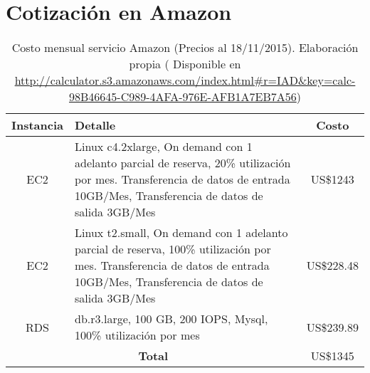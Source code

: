 \section{Cotización en Amazon} \label{sec:cotizacionAmazon}

\begin{table}[H]
	\centering
	\begin{tabular}{| c | p{10cm} | c |}
		\hline
		Instancia    & Detalle & Costo\\ \hline
		EC2 &  Linux c4.2xlarge, On demand con 1 adelanto parcial de reserva, 20\% utilización por mes. Transferencia de datos de entrada 10GB/Mes, Transferencia de datos de salida 3GB/Mes & US\$1243
		
		 \\ \hline
		EC2 &  Linux t2.small, On demand con 1 adelanto parcial de reserva, 100\% utilización por mes. Transferencia de datos de entrada 10GB/Mes, Transferencia de datos de salida 3GB/Mes & US\$228.48
		 \\ \hline
		RDS &  db.r3.large, 100 GB, 200 IOPS, Mysql, 100\% utilización por mes  & US\$239.89
		\\ \hline
		\multicolumn{2}{|c|}{\textbf{Total}}  & US\$1345
		\\ \hline
	\end{tabular}
	\caption {Costo mensual servicio Amazon (Precios al 18/11/2015). Elaboración propia ( Disponible en \url{http://calculator.s3.amazonaws.com/index.html\#r=IAD\&key=calc-98B46645-C989-4AFA-976E-AFB1A7EB7A56})}
	
	\label{cotizacionAmazon}
\end{table}